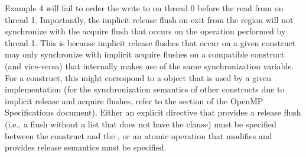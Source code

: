 
Example 4 will fail to order the write to  on thread 0 before the read
from  on thread 1. Importantly, the implicit release flush on exit from
the  region will not synchronize with the acquire flush that
occurs on the  operation performed by thread 1. This is because
implicit release flushes that occur on a given construct may only synchronize
with implicit acquire flushes on a compatible construct (and vice-versa) that
internally makes use of the same synchronization variable. For a
 construct, this might correspond to a  object that
is used by a given implementation (for the synchronization semantics of other
constructs due to implicit release and acquire flushes, refer to the  section of the OpenMP Specifications document).  Either an explicit 
directive that provides a release flush (i.e., a flush without a list that does
not have the  clause) must be specified between the
 construct and the , or an atomic operation that
modifies  and provides release semantics must be specified.


